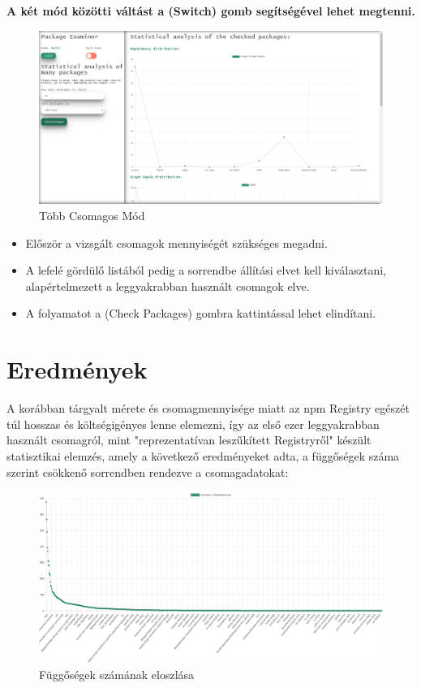 \pagebreak

\textbf{A két mód közötti váltást a (Switch) gomb segítségével lehet megtenni.}

\begin{figure}[!h]
	\centering
	\includegraphics[scale=0.2]{images/statistics.png}
	\caption{Több Csomagos Mód}
	\label{fig:examiner}
\end{figure}

\begin{itemize}
	\item Először a vizsgált csomagok mennyiségét szükséges megadni.
	\item A lefelé gördülő listából pedig a sorrendbe állítási elvet kell kiválasztani, alapértelmezett a leggyakrabban használt csomagok elve.
	\item A folyamatot a (Check Packages) gombra kattintással lehet elindítani.
\end{itemize}

\section{Eredmények}

A korábban tárgyalt mérete és csomagmennyisége miatt az npm Registry egészét túl hosszas és költségigényes lenne elemezni, így az első ezer leggyakrabban használt csomagról, mint "reprezentatívan leszűkített Registryről" készült statisztikai elemzés, amely a következő eredményeket adta, a függőségek száma szerint csökkenő sorrendben rendezve a csomagadatokat:

\begin{figure}[!h]
	\centering
	\includegraphics[scale=0.12]{images/depdist.png}
	\caption{Függőségek számának eloszlása}
	\label{fig:depdist}
\end{figure}  

